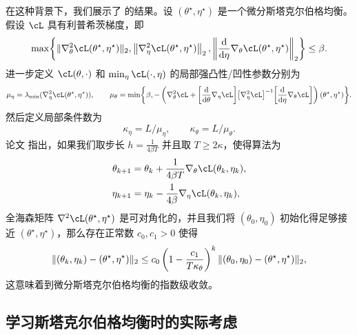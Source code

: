 \documentclass[../../book-main_zh.tex]{subfiles}
\begin{document}
在这种背景下，我们展示了 \cite{li2022convergence} 的结果。设 \((\theta^{\star}, \eta^{\star})\) 是一个微分斯塔克尔伯格均衡。假设 \(\cL\) 具有利普希茨梯度，即
\begin{equation}
    \max\rc{\norm{\nabla_{\theta}^{2}\cL(\theta^{\star}, \eta^{\star})}_{2}, \norm*{\nabla_{\eta}^{2}\cL(\theta^{\star}, \eta^{\star})}_{2},  \norm*{\odv*{\nabla_{\theta}\cL(\theta^{\star}, \eta^{\star})}{\eta}}_{2}} \leq \beta.
\end{equation}
进一步定义 \(\cL(\theta, \cdot)\) 和 \(\min_{\eta}\cL(\cdot, \eta)\) 的局部强凸性/凹性参数分别为
\begin{equation}
    \mu_{\eta} = \lambda_{\min}(\nabla_{\eta}^{2}\cL(\theta^{\star}, \eta^{\star})), \qquad \mu_{\theta} = \min\rc{\beta, -\bp{\nabla_{\theta}^{2}\cL + \rs{\odv*{\nabla_{\eta}\cL}{\theta}}\rs{\nabla_{\eta}^{2}\cL}^{-1}\rs{\odv*{\nabla_{\theta}\cL}{\eta}}}(\theta^{\star}, \eta^{\star})}.
\end{equation}
然后定义局部条件数为
\begin{equation}
    \kappa_{\eta} = L/\mu_{\eta}, \qquad \kappa_{\theta} = L/\mu_{\theta}.
\end{equation}
论文 \cite{li2022convergence} 指出，如果我们取步长 \(h = \frac{1}{4\beta T}\) 并且取 \(T \geq 2\kappa\)，使得算法为
\begin{align}
    \theta_{k + 1}
    &= \theta_{k} + \frac{1}{4\beta T}\nabla_{\theta} \cL(\theta_{k}, \eta_{k}), \\
    \eta_{k + 1}
    &= \eta_{k} - \frac{1}{4\beta}\nabla_{\eta} \cL(\theta_{k}, \eta_{k}),
\end{align}
全海森矩阵 \(\nabla^{2}\cL(\theta^{\star}, \eta^{\star})\) 是可对角化的，并且我们将 \((\theta_{0}, \eta_{0})\) 初始化得足够接近 \((\theta^{\star}, \eta^{\star})\)，那么存在正常数 \(c_{0}, c_{1} > 0\) 使得
\begin{equation}
    \norm{(\theta_{k}, \eta_{k}) - (\theta^{\star}, \eta^{\star})}_{2} \leq c_{0}\bp{1 - \frac{c_{1}}{T\kappa_{\theta}}}^{k}\norm{(\theta_{0}, \eta_{0}) - (\theta^{\star}, \eta^{\star})}_{2},
\end{equation}
这意味着到微分斯塔克尔伯格均衡的指数级收敛。

\subsection{学习斯塔克尔伯格均衡时的实际考虑}
\end{document}
